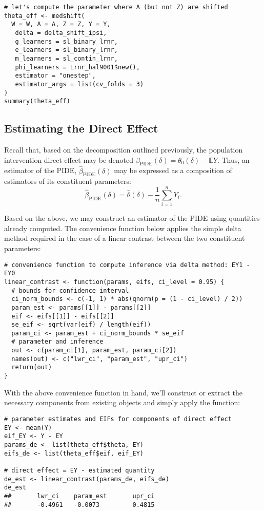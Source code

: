 \begin{lstlisting}
# let's compute the parameter where A (but not Z) are shifted
theta_eff <- medshift(
  W = W, A = A, Z = Z, Y = Y,
   delta = delta_shift_ipsi,
   g_learners = sl_binary_lrnr,
   e_learners = sl_binary_lrnr,
   m_learners = sl_contin_lrnr,
   phi_learners = Lrnr_hal9001$new(),
   estimator = "onestep",
   estimator_args = list(cv_folds = 3)
)
summary(theta_eff)
\end{lstlisting}

\subsection{Estimating the Direct Effect}

Recall that, based on the decomposition outlined previously, the population
intervention direct effect may be denoted $\beta_{\text{PIDE}}(\delta) =
\theta_0(\delta) - \mathbb{E}Y$. Thus, an estimator of the PIDE,
$\hat{\beta}_{\text{PIDE}}(\delta)$ may be expressed as a composition of
estimators of its constituent parameters:
\begin{equation*}
  \hat{\beta}_{\text{PIDE}}({\delta}) = \hat{\theta}(\delta) -
  \frac{1}{n} \sum_{i = 1}^n Y_i.
\end{equation*}

Based on the above, we may construct an estimator of the PIDE using quantities
already computed. The convenience function below applies the simple delta method
required in the case of a linear contrast between the two constituent
parameters:
\begin{lstlisting}
# convenience function to compute inference via delta method: EY1 - EY0
linear_contrast <- function(params, eifs, ci_level = 0.95) {
  # bounds for confidence interval
  ci_norm_bounds <- c(-1, 1) * abs(qnorm(p = (1 - ci_level) / 2))
  param_est <- params[[1]] - params[[2]]
  eif <- eifs[[1]] - eifs[[2]]
  se_eif <- sqrt(var(eif) / length(eif))
  param_ci <- param_est + ci_norm_bounds * se_eif
  # parameter and inference
  out <- c(param_ci[1], param_est, param_ci[2])
  names(out) <- c("lwr_ci", "param_est", "upr_ci")
  return(out)
}
\end{lstlisting}

With the above convenience function in hand, we'll construct or extract the
necessary components from existing objects and simply apply the function:
\begin{lstlisting}
# parameter estimates and EIFs for components of direct effect
EY <- mean(Y)
eif_EY <- Y - EY
params_de <- list(theta_eff$theta, EY)
eifs_de <- list(theta_eff$eif, eif_EY)

# direct effect = EY - estimated quantity
de_est <- linear_contrast(params_de, eifs_de)
de_est
##       lwr_ci    param_est       upr_ci
##       -0.4961   -0.0073         0.4815
\end{lstlisting}

